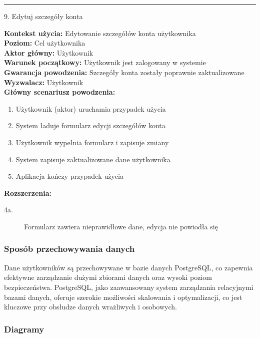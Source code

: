 \noindent\rule{14cm}{0.1pt} %

\clearpage

{\noindent \bf{\small 9. Edytuj szczegóły konta\par}}
\vspace{0.5cm}
{\noindent \bf Kontekst użycia: } Edytowanie szczegółów konta użytkownika\\
{\bf Poziom: } Cel użytkownika\\
{\bf Aktor główny: } Użytkownik\\
{\bf Warunek początkowy: } Użytkownik jest zalogowany w systemie\\
{\bf Gwarancja powodzenia: } Szczegóły konta zostały poprawnie zaktualizowane\\
{\bf Wyzwalacz: } Użytkownik\\
{\bf Główny scenariusz powodzenia: }
\begin{enumerate}
    \item Użytkownik (aktor) uruchamia przypadek użycia
    \item System ładuje formularz edycji szczegółów konta
    \item Użytkownik wypełnia formularz i zapisuje zmiany
    \item System zapisuje zaktualizowane dane użytkownika
    \item Aplikacja kończy przypadek użycia
\end{enumerate}
{\noindent \bf Rozszerzenia: }
\begin{description}
    \item[4a.] Formularz zawiera nieprawidłowe dane, edycja nie powiodła się
\end{description}

\subsubsection{Sposób przechowywania danych}
Dane użytkowników są przechowywane w bazie danych PostgreSQL, co zapewnia efektywne zarządzanie dużymi zbiorami danych oraz wysoki poziom bezpieczeństwa. PostgreSQL, jako zaawansowany system zarządzania relacyjnymi bazami danych, oferuje szerokie możliwości skalowania i optymalizacji, co jest kluczowe przy obsłudze danych wrażliwych i osobowych.

\clearpage

\subsubsection{Diagramy}


